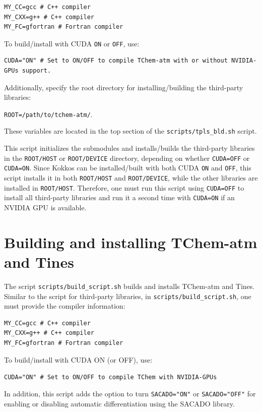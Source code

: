 \documentclass[report, 12pt]{SANDreport}
\begin{document}
\begin{verbatim}
MY_CC=gcc # C++ compiler
MY_CXX=g++ # C++ compiler
MY_FC=gfortran # Fortran compiler
\end{verbatim}

To build/install with CUDA \verb|ON| or \verb|OFF|, use:

\begin{Verbatim}
CUDA="ON" # Set to ON/OFF to compile TChem-atm with or without NVIDIA-GPUs support.
\end{Verbatim}

Additionally, specify the root directory for installing/building the third-party libraries:

\verb|ROOT=/path/to/tchem-atm/|.

These variables are located in the top section of the \verb|scripts/tpls_bld.sh| script.

This script initializes the submodules and installs/builds the third-party libraries in the \verb|ROOT/HOST| or \verb|ROOT/DEVICE| directory, depending on whether \verb|CUDA=OFF| or \verb|CUDA=ON|. Since Kokkos can be installed/built with both CUDA \verb|ON| and \verb|OFF|, this script installs it in both \verb|ROOT/HOST| and \verb|ROOT/DEVICE|, while the other libraries are installed in \verb|ROOT/HOST|. Therefore, one must run this script using \verb|CUDA=OFF| to install all third-party libraries and run it a second time with \verb|CUDA=ON| if an NVIDIA GPU is available.

\section{Building and installing TChem-atm and Tines}

The script \verb|scripts/build_script.sh| builds and installs TChem-atm and Tines. Similar to the script for third-party libraries, in \verb|scripts/build_script.sh|, one must provide the compiler information:

\begin{verbatim}
MY_CC=gcc # C++ compiler
MY_CXX=g++ # C++ compiler
MY_FC=gfortran # Fortran compiler
\end{verbatim}

To build/install with CUDA ON (or OFF), use:

\verb|CUDA="ON" # Set to ON/OFF to compile TChem with NVIDIA-GPUs|

In addition, this script adds the option to turn \verb|SACADO="ON"| or \verb|SACADO="OFF"| for enabling or disabling automatic differentiation using the SACADO library.
\end{document}
